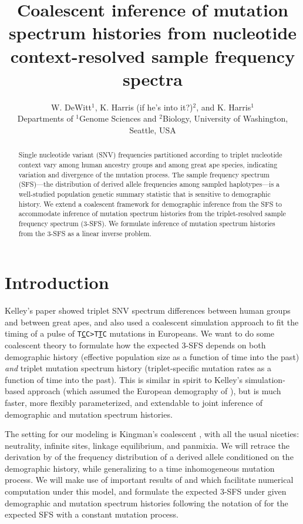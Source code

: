 \documentclass[11pt]{article}
\title{Coalescent inference of mutation spectrum histories from nucleotide context-resolved sample frequency spectra}
\author{
W. DeWitt$^{1}$, K. Harris (if he's into it?)$^{2}$, and K. Harris$^{1}$\\
\small{Departments of $^1$Genome Sciences and $^2$Biology, University of Washington, Seattle, USA}
}
\begin{document}
\maketitle

\begin{abstract}

Single nucleotide variant (SNV) frequencies partitioned according to triplet nucleotide context vary among human ancestry groups and among great ape species, indicating variation and divergence of the mutation process.
The sample frequency spectrum (SFS)---the distribution of derived allele frequencies among sampled haplotypes---is a well-studied population genetic summary statistic that is sensitive to demographic history.
We extend a coalescent framework for demographic inference from the SFS to accommodate inference of mutation spectrum histories from the triplet-resolved sample frequency spectrum (3-SFS).
We formulate inference of mutation spectrum histories from the 3-SFS as a linear inverse problem.

\end{abstract}


\section*{Introduction}\label{sec:intro}

Kelley's paper \cite{Harris2017-fw} showed triplet SNV spectrum differences between human groups and between great apes, and also used a coalescent simulation approach to fit the timing of a pulse of \texttt{T\underline{C}C>T\underline{T}C} mutations in Europeans.
We want to do some coalescent theory to formulate how the expected 3-SFS depends on both demographic history (effective population size as a function of time into the past) \emph{and} triplet mutation spectrum history (triplet-specific mutation rates as a function of time into the past).
This is similar in spirit to Kelley's simulation-based approach (which assumed the European demography of \cite{?}), but is much faster, more flexibly parameterized, and extendable to joint inference of demographic and mutation spectrum histories.

The setting for our modeling is Kingman's coalescent \citep{Kingman1982-ge, Kingman1982-tf, Kingman1982-ys, Kingman2000-jr}, with all the usual niceties: neutrality, infinite sites, linkage equilibrium, and panmixia.
We will retrace the derivation by \cite{Griffiths1998-qf} of the frequency distribution of a derived allele conditioned on the demographic history, while generalizing to a time inhomogeneous mutation process.
We will make use of important results of \cite{Polanski2003-kg} and \cite{Polanski2003-ll} which facilitate numerical computation under this model, and formulate the expected 3-SFS under given demographic and mutation spectrum histories following the notation of \cite{Rosen2018-bb} for the expected SFS with a constant mutation process.
\end{document}

